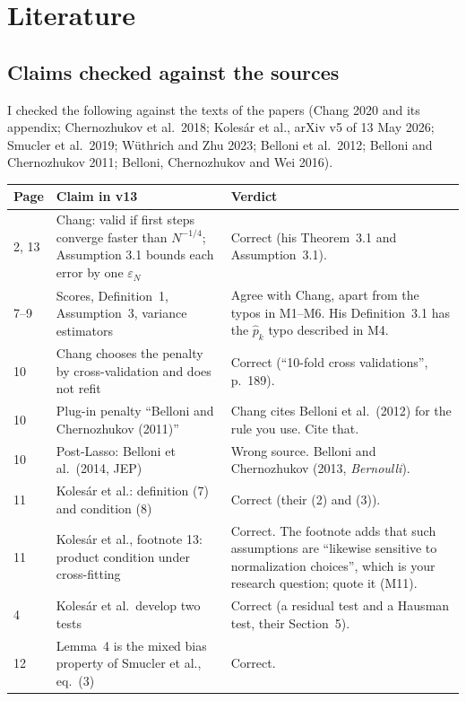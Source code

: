\documentclass[11pt]{article}
\theoremstyle{plain}
\theoremstyle{remark}
\begin{document}
\section{Literature}\label{sec:lit}

\subsection{Claims checked against the sources}
I checked the following against the texts of the papers (Chang 2020 and its
appendix; Chernozhukov et al.\ 2018; Kolesár et al., arXiv v5 of 13 May 2026;
Smucler et al.\ 2019; Wüthrich and Zhu 2023; Belloni et al.\ 2012; Belloni and
Chernozhukov 2011; Belloni, Chernozhukov and Wei 2016).

\begin{center}\small
\begin{tabular}{p{}p{}p{}}
\toprule
Page & Claim in v13 & Verdict\\
\midrule
2, 13 & Chang: valid if first steps converge faster than $N^{-1/4}$; Assumption
  3.1 bounds each error by one $\varepsilon_N$ & Correct (his Theorem~3.1 and
  Assumption~3.1).\\
7--9 & Scores, Definition~1, Assumption~3, variance estimators & Agree with
  Chang, apart from the typos in M1--M6. His Definition~3.1 has the
  $\hat p_k$ typo described in M4.\\
10 & Chang chooses the penalty by cross-validation and does not refit & Correct
  (``10-fold cross validations'', p.~189).\\
10 & Plug-in penalty ``Belloni and Chernozhukov (2011)'' & Chang cites
  Belloni et al.\ (2012) for the rule you use. Cite that.\\
10 & Post-Lasso: Belloni et al.\ (2014, JEP) & Wrong source. Belloni and
  Chernozhukov (2013, \emph{Bernoulli}).\\
11 & Kolesár et al.: definition (7) and condition (8) & Correct (their (2) and
  (3)).\\
11 & Kolesár et al., footnote 13: product condition under cross-fitting &
  Correct. The footnote adds that such assumptions are ``likewise sensitive to
  normalization choices'', which is your research question; quote it (M11).\\
4 & Kolesár et al.\ develop two tests & Correct (a residual test and a Hausman
  test, their Section~5).\\
12 & Lemma~4 is the mixed bias property of Smucler et al., eq.~(3) & Correct.

\end{tabular}
\end{center}
\end{document}
